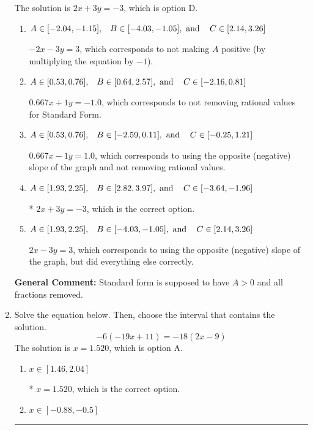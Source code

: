 \documentclass{extbook}[14pt]
\newcommand{\litem}[1]{\item #1

\rule{\textwidth}{0.4pt}}
\begin{document}
\begin{enumerate}
{The solution is \( 2x + 3y = -3 \), which is option D.\begin{enumerate}[label=\Alph*.]
\item \( A \in [-2.04, -1.15], \hspace{3mm} B \in [-4.03, -1.05], \text{ and } \hspace{3mm} C \in [2.14, 3.26] \)

 $-2x - 3y = 3$, which corresponds to not making $A$ positive (by multiplying the equation by $-1$).
\item \( A \in [0.53, 0.76], \hspace{3mm} B \in [0.64, 2.57], \text{ and } \hspace{3mm} C \in [-2.16, 0.81] \)

 $0.667x + 1y = -1.0$, which corresponds to not removing rational values for Standard Form.
\item \( A \in [0.53, 0.76], \hspace{3mm} B \in [-2.59, 0.11], \text{ and } \hspace{3mm} C \in [-0.25, 1.21] \)

 $0.667x - 1y = 1.0$, which corresponds to using the opposite (negative) slope of the graph and not removing rational values.
\item \( A \in [1.93, 2.25], \hspace{3mm} B \in [2.82, 3.97], \text{ and } \hspace{3mm} C \in [-3.64, -1.96] \)

* $2x + 3y = -3$, which is the correct option.
\item \( A \in [1.93, 2.25], \hspace{3mm} B \in [-4.03, -1.05], \text{ and } \hspace{3mm} C \in [2.14, 3.26] \)

 $2x - 3y = 3$, which corresponds to using the opposite (negative) slope of the graph, but did everything else correctly.
\end{enumerate}

\textbf{General Comment:} Standard form is supposed to have $A > 0$ and all fractions removed.
}
\litem{
Solve the equation below. Then, choose the interval that contains the solution.
\[ -6(-19x + 11) = -18(2x -9) \]The solution is \( x = 1.520 \), which is option A.\begin{enumerate}[label=\Alph*.]
\item \( x \in [1.46, 2.04] \)

* $x = 1.520$, which is the correct option.
\item \( x \in [-0.88, -0.5] \)


\end{enumerate}}
\end{enumerate}
\end{document}
